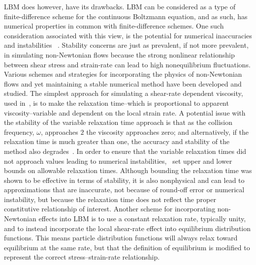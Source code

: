 \documentclass{article}
\begin{document}
LBM does however, have its drawbacks.
LBM can be considered as a type of finite-difference scheme for the continuous Boltzmann equation, and as such, has numerical properties in common with finite-difference schemes. %
One such consideration associated with this view, is the potential for numerical inaccuracies and instabilities ~\cite{sterling1993stability,sterling1996stability,bawazeer2013stability,lallemand2000theory}. %
Stability concerns are just as prevalent, if not more prevalent, in simulating non-Newtonian flows because the strong nonlinear relationship between shear stress and strain-rate can lead to high nonequilibrium fluctuations. %
Various schemes and strategies for incorporating the physics of non-Newtonian flows and yet maintaining a stable numerical method have been developed and studied.
The simplest approach for simulating a shear-rate dependent viscosity, used in~\cite{boyd2006second,chen2014simulations,fallah2012multiple,tang2011bingham,svec2011flow,svec2012free}, is to make the relaxation time--which is proportional to apparent viscosity--variable and dependent on the local strain rate.
A potential issue with the stability of the variable relaxation time approach is that as the collision frequency, $\omega$, approaches $2$ the viscosity approaches zero; and alternatively, if the relaxation time is much greater than one, the accuracy and stability of the method also degrades~\cite{latt2007hydrodynamic}.
In order to ensure that the variable relaxation times did not approach values leading to numerical instabilities,~\cite{svec2011flow,svec2012free,gabbanelli2005lattice} set upper and lower bounds on allowable relaxation times.
Although bounding the relaxation time was shown to be effective in terms of stability, it is also nonphysical and can lead to approximations that are inaccurate, not because of round-off error or numerical instability, but because the relaxation time does not reflect the proper constitutive relationship of interest.
Another scheme for incorporating non-Newtonian effects into LBM is to use a constant relaxation rate, typically unity, and to instead incorporate the local shear-rate effect into equilibrium distribution functions.
This means particle distribution functions will always relax toward equilibrium at the same rate, but that the definition of equilibrium is modified to represent the correct stress--strain-rate relationship.
\end{document}
